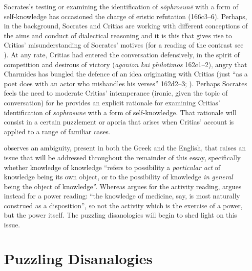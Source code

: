 Socrates's testing or examining the identification of \emph{sōphrosunē} with a form of self-knowledge has occasioned the charge of eristic refutation (166c3–6). Perhaps, in the background, Socrates and Critias are working with different conceptions of the aims and conduct of dialectical reasoning and it is this that gives rise to Critias' misunderstanding of Socrates' motives (for a reading of the contrast see \citealt[chapter 4]{Schmid:1998aa}). At any rate, Critias had entered the conversation defensively, in the spirit of competition and desirous of victory (\emph{agōniōn kai philotimōs} 162c1–2), angry that Charmides has bungled the defence of an idea originating with Critias (just ``as a poet does with an actor who mishandles his verses'' 162d2–3; \citealt[41]{Lamb:1927qw}). Perhaps Socrates feels the need to moderate Critias' intemperance (ironic, given the topic of conversation) for he provides an explicit rationale for examining Critias' identification of \emph{sōphrosunē} with a form of self-knowledge. That rationale will consist in a certain puzzlement or aporia that arises when Critias' account is applied to a range of familiar cases.

\citet[44]{Tuckey:1951aa} observes an ambiguity, present in both the Greek and the English, that raises an issue that will be addressed throughout the remainder of this essay, specifically whether knowledge of knowledge ``refers to possibility a \emph{particular act} of knowledge being its own object, or to the possibility of knowledge \emph{in general} being the object of knowledge''. Whereas \citet[772–3]{caston02} argues for the activity reading, \citet[218]{Tuozzo:2011aa} argues instead for a power reading: ``the knowledge of medicine, say, is most naturally construed as a disposition'', so not the activity which is the exercise of a power, but the power itself. The puzzling disanologies will begin to shed light on this issue.


\section{Puzzling Disanalogies} %
\label{sec:puzzling_disanalogies}

